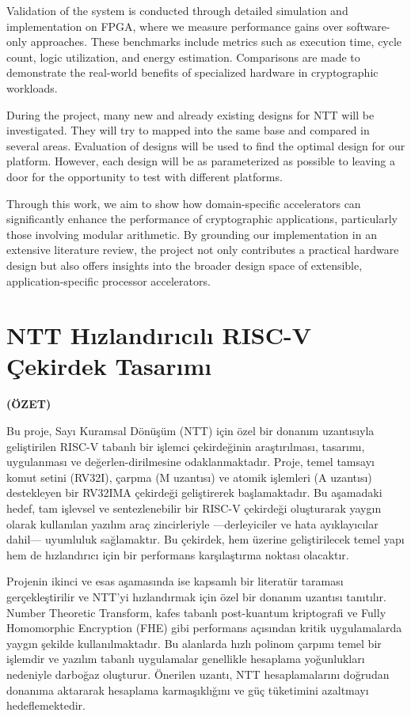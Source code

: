 \documentclass[a4paper, 12pt, titlepage]{article}
\newcommand{\theturkishtitle}{NTT Hızlandırıcılı RISC-V Çekirdek Tasarımı}
\begin{document}
Validation of the system is conducted through detailed simulation and implementation on FPGA, where we measure performance gains over software-only approaches. These benchmarks include metrics such as execution time, cycle count, logic utilization, and energy estimation. Comparisons are made to demonstrate the real-world benefits of specialized hardware in cryptographic workloads.

During the project, many new and already existing designs for NTT will be investigated. They will try to mapped into the same base and compared in several areas. Evaluation of designs will be used to find the optimal design for our platform. However, each design will be as parameterized as possible to leaving a door for the opportunity to test with different platforms.

Through this work, we aim to show how domain-specific accelerators can significantly enhance the performance of cryptographic applications, particularly those involving modular arithmetic. By grounding our implementation in an extensive literature review, the project not only contributes a practical hardware design but also offers insights into the broader design space of extensible, application-specific processor accelerators.

\newpage
\section*{\centering\theturkishtitle}
\centerline{\fontsize{16pt}{21.6pt}\sffamily\bfseries (ÖZET)}

Bu proje, Sayı Kuramsal Dönüşüm (NTT) için özel bir donanım uzantısıyla geliştirilen RISC-V tabanlı bir işlemci çekirdeğinin araştırılması, tasarımı, uygulanması ve değerlen-dirilmesine odaklanmaktadır. Proje, temel tamsayı komut setini (RV32I), çarpma (M uzantısı) ve atomik işlemleri (A uzantısı) destekleyen bir RV32IMA çekirdeği geliştirerek başlamaktadır. Bu aşamadaki hedef, tam işlevsel ve sentezlenebilir bir RISC-V çekirdeği oluşturarak yaygın olarak kullanılan yazılım araç zincirleriyle —derleyiciler ve hata ayıklayıcılar dahil— uyumluluk sağlamaktır. Bu çekirdek, hem üzerine geliştirilecek temel yapı hem de hızlandırıcı için bir performans karşılaştırma noktası olacaktır.

Projenin ikinci ve esas aşamasında ise kapsamlı bir literatür taraması gerçekleştirilir ve NTT’yi hızlandırmak için özel bir donanım uzantısı tanıtılır. Number Theoretic Transform, kafes tabanlı post-kuantum kriptografi ve Fully Homomorphic Encryption (FHE) gibi performans açısından kritik uygulamalarda yaygın şekilde kullanılmaktadır. Bu alanlarda hızlı polinom çarpımı temel bir işlemdir ve yazılım tabanlı uygulamalar genellikle hesaplama yoğunlukları nedeniyle darboğaz oluşturur. Önerilen uzantı, NTT hesaplamalarını doğrudan donanıma aktararak hesaplama karmaşıklığını ve güç tüketimini azaltmayı hedeflemektedir.
\end{document}
